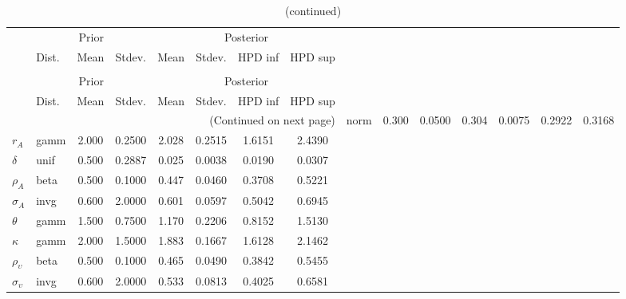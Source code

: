  
\begin{center}
\begin{longtable}{llcccccc} 
\caption{Results from Metropolis-Hastings (parameters)}
 \label{Table:MHPosterior:1}\\
\toprule 
  & \multicolumn{3}{c}{Prior}  &  \multicolumn{4}{c}{Posterior} \\
  \cmidrule(r{.75em}){2-4} \cmidrule(r{.75em}){5-8}
  & Dist. & Mean  & Stdev. & Mean & Stdev. & HPD inf & HPD sup\\
\midrule \endfirsthead 
\caption{(continued)}\\\toprule 
  & \multicolumn{3}{c}{Prior}  &  \multicolumn{4}{c}{Posterior} \\
  \cmidrule(r{.75em}){2-4} \cmidrule(r{.75em}){5-8}
  & Dist. & Mean  & Stdev. & Mean & Stdev. & HPD inf & HPD sup\\
\midrule \endhead 
\bottomrule \multicolumn{8}{r}{(Continued on next page)} \endfoot 
\bottomrule \endlastfoot 
${\alpha}$ & norm &   0.300 & 0.0500 &   0.304& 0.0075 &  0.2922 &  0.3168 \\ 
${r_{A}}$ & gamm &   2.000 & 0.2500 &   2.028& 0.2515 &  1.6151 &  2.4390 \\ 
${\delta}$ & unif &   0.500 & 0.2887 &   0.025& 0.0038 &  0.0190 &  0.0307 \\ 
${\rho_A}$ & beta &   0.500 & 0.1000 &   0.447& 0.0460 &  0.3708 &  0.5221 \\ 
${\sigma_A}$ & invg &   0.600 & 2.0000 &   0.601& 0.0597 &  0.5042 &  0.6945 \\ 
${\theta}$ & gamm &   1.500 & 0.7500 &   1.170& 0.2206 &  0.8152 &  1.5130 \\ 
${\kappa}$ & gamm &   2.000 & 1.5000 &   1.883& 0.1667 &  1.6128 &  2.1462 \\ 
${\rho_\upsilon}$ & beta &   0.500 & 0.1000 &   0.465& 0.0490 &  0.3842 &  0.5455 \\ 
${\sigma_\upsilon}$ & invg &   0.600 & 2.0000 &   0.533& 0.0813 &  0.4025 &  0.6581 \\ 
\end{longtable}
 \end{center}
